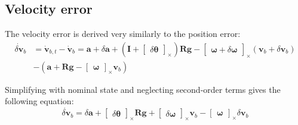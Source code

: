 \subsection{Velocity error}

The velocity error is derived very similarly to the position error:
\begin{equation}
    \begin{aligned}
        \dot{\delta\mathbf{v}}_b&=\dot{\mathbf{v}}_{b,t}-\dot{\mathbf{v}}_b 
        =\mathbf{a}+\delta\mathbf{a}+\left(\mathbf{I}+\begin{bmatrix} \delta\boldsymbol{\theta} \end{bmatrix}_\times\right)
        \mathbf{R}\mathbf{g}-\begin{bmatrix} \boldsymbol{\omega}+\delta\boldsymbol{\omega} \end{bmatrix}_\times (\mathbf{v}_b+\delta\mathbf{v}_b) \\ &
        -(\mathbf{a}+\mathbf{R}\mathbf{g}-\begin{bmatrix} \boldsymbol{\omega} \end{bmatrix}_\times \mathbf{v}_b)
    \end{aligned}
\end{equation}

Simplifying with nominal state and neglecting second-order terms gives the following equation:
\begin{equation}
    \dot{\delta\mathbf{v}}_b=\delta\mathbf{a}+\begin{bmatrix}
        \delta\boldsymbol{\theta}
    \end{bmatrix}_\times\mathbf{R}\mathbf{g}+\begin{bmatrix}
        \delta\boldsymbol{\omega}
    \end{bmatrix}_\times\mathbf{v}_b-\begin{bmatrix}
        \boldsymbol{\omega}
    \end{bmatrix}_\times\delta\mathbf{v}_b
\end{equation}

